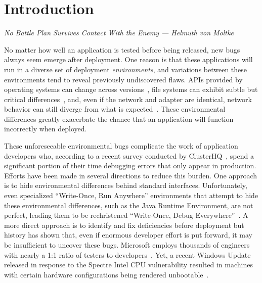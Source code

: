\section{Introduction}
\label{SEC:introduction}
\textit{No Battle Plan Survives Contact With the Enemy --- Helmuth von Moltke}

No matter how well an application is tested before being released,
new bugs always seem emerge after deployment.
One reason is that these applications will run in a diverse set of
deployment \emph{environments},
and variations between these environments tend to
reveal previously undiscovered flaws.
APIs provided by operating systems can change across versions~\cite{LinuxGlibcChanges},
file systems can exhibit subtle but critical differences~\cite{EXT4Layout, AppleHFS},
and, even if the network and adapter are identical,
network behavior can still diverge from what is expected~\cite{vbox}.
These environmental differences greatly exacerbate
the chance that an application will function incorrectly when deployed.

These unforeseeable environmental bugs
complicate the work of application developers who, according to a
recent survey conducted by ClusterHQ~\cite{ClusterHQSurvey},
spend a significant portion of their time
debugging errors that only appear in production.
Efforts have been made in several directions to reduce this burden.  One
approach is to hide environmental differences behind standard interfaces.
Unfortunately,
even specialized ``Write-Once, Run Anywhere'' environments
that attempt to hide these environmental differences,
such as the Java Runtime Environment,
are not perfect,
leading them to be rechristened ``Write-Once, Debug Everywhere''~\cite{WODE}.
A more direct approach is
to identify and fix deficiencies before deployment
but history has shown that,
even if enormous developer effort is put forward,
it may be insufficient to uncover these bugs.
Microsoft employs thousands of engineers with nearly a
1:1 ratio of testers to developers~\cite{Page2009}.
Yet, a recent Windows Update released
in response to the Spectre Intel CPU vulnerability
resulted in machines with certain hardware configurations
being rendered unbootable~\cite{kb4056892}.


